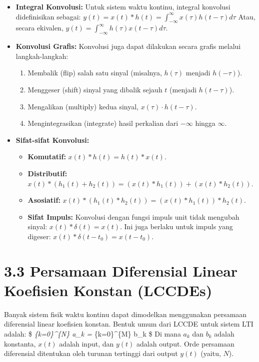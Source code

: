 \documentclass[
  letterpaper,
  DIV=11,
  numbers=noendperiod]{scrreprt}
\providecommand{\tightlist}{%
  \setlength{\itemsep}{0pt}\setlength{\parskip}{0pt}}
\begin{document}
\begin{itemize}
\tightlist
\item
  \textbf{Integral Konvolusi:} Untuk sistem waktu kontinu, integral
  konvolusi didefinisikan sebagai:
  \(y(t) = x(t) * h(t) = \int_{-\infty}^{\infty} x(\tau)h(t-\tau)d\tau\)
  Atau, secara ekivalen,
  \(y(t) = \int_{-\infty}^{\infty} h(\tau)x(t-\tau)d\tau\).
\item
  \textbf{Konvolusi Grafis:} Konvolusi juga dapat dilakukan secara
  grafis melalui langkah-langkah:

  \begin{enumerate}
  \def\labelenumi{\arabic{enumi}.}
  \tightlist
  \item
    Membalik (flip) salah satu sinyal (misalnya, \(h(\tau)\) menjadi
    \(h(-\tau)\)).
  \item
    Menggeser (shift) sinyal yang dibalik sejauh \(t\) (menjadi
    \(h(t-\tau)\)).
  \item
    Mengalikan (multiply) kedua sinyal, \(x(\tau) \cdot h(t-\tau)\).
  \item
    Mengintegrasikan (integrate) hasil perkalian dari \(-\infty\) hingga
    \(\infty\).
  \end{enumerate}
\item
  \textbf{Sifat-sifat Konvolusi:}

  \begin{itemize}
  \tightlist
  \item
    \textbf{Komutatif:} \(x(t) * h(t) = h(t) * x(t)\).
  \item
    \textbf{Distributif:}
    \(x(t) * (h_1(t) + h_2(t)) = (x(t) * h_1(t)) + (x(t) * h_2(t))\).
  \item
    \textbf{Asosiatif:}
    \(x(t) * (h_1(t) * h_2(t)) = (x(t) * h_1(t)) * h_2(t)\).
  \item
    \textbf{Sifat Impuls:} Konvolusi dengan fungsi impuls unit tidak
    mengubah sinyal: \(x(t) * \delta(t) = x(t)\). Ini juga berlaku untuk
    impuls yang digeser: \(x(t) * \delta(t-t_0) = x(t-t_0)\).
  \end{itemize}
\end{itemize}

\section{3.3 Persamaan Diferensial Linear Koefisien Konstan
(LCCDEs)}\label{persamaan-diferensial-linear-koefisien-konstan-lccdes}

Banyak sistem fisik waktu kontinu dapat dimodelkan menggunakan persamaan
diferensial linear koefisien konstan. Bentuk umum dari LCCDE untuk
sistem LTI adalah: \$ \sum\emph{\{k=0\}\^{}\{N\} a\_k
 = \sum}\{k=0\}\^{}\{M\} b\_k 
\$ Di mana \(a_k\) dan \(b_k\) adalah konstanta, \(x(t)\) adalah input,
dan \(y(t)\) adalah output. Orde persamaan diferensial ditentukan oleh
turunan tertinggi dari output \(y(t)\) (yaitu, \(N\)).
\end{document}
